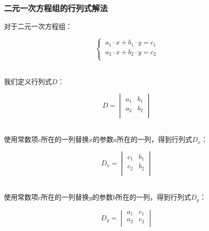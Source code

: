 \documentclass[UTF8]{ctexart}
\begin{document}
\subsubsection{二元一次方程组的行列式解法}
    对于二元一次方程组：
    \begin{large}
        \begin{equation*}
            \begin{cases}
                \ a_{1}\cdot x+b_{1}\cdot y=c_{1}\\
                \ a_{2}\cdot x+b_{2}\cdot y=c_{2}\\
            \end{cases}
        \end{equation*}
    \end{large}\\
    我们定义行列式$D$：
    \begin{large}
        \begin{equation*}
            D=
            \begin{vmatrix}
                a_1&b_1\\
                a_2&b_2\\
            \end{vmatrix}
        \end{equation*}
    \end{large}\\
    使用常数项$c$所在的一列替换$x$的参数$a$所在的一列，得到行列式$D_x$：
    \begin{large}
        \begin{equation*}
            D_x=
            \begin{vmatrix}
                c_1&b_1\\
                c_2&b_2\\
            \end{vmatrix}
        \end{equation*}
    \end{large}\\
    使用常数项$c$所在的一列替换$y$的参数$b$所在的一列，得到行列式$D_y$：
    \begin{large}
        \begin{equation*}
            D_y=
            \begin{vmatrix}
                a_1&c_1\\
                a_2&c_2\\
            \end{vmatrix}
        \end{equation*}
    \end{large}
\end{document}
